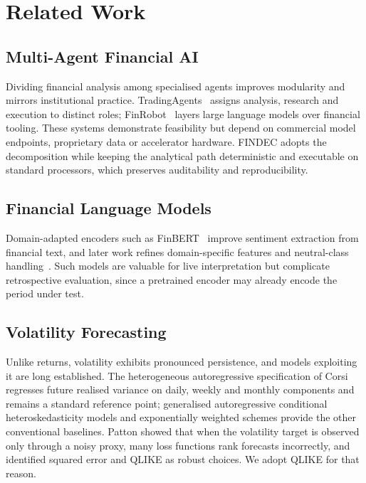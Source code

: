 \documentclass[conference]{IEEEtran}
\begin{document}
\section{Related Work}
\label{sec:related}

\subsection{Multi-Agent Financial AI}
Dividing financial analysis among specialised agents improves modularity and
mirrors institutional practice. TradingAgents~\cite{xiao2024tradingagents}
assigns analysis, research and execution to distinct roles;
FinRobot~\cite{yang2024finrobot} layers large language models over financial
tooling. These systems demonstrate feasibility but depend on commercial model
endpoints, proprietary data or accelerator hardware. FINDEC adopts the
decomposition while keeping the analytical path deterministic and executable
on standard processors, which preserves auditability and reproducibility.

\subsection{Financial Language Models}
Domain-adapted encoders such as FinBERT~\cite{araci2019finbert} improve
sentiment extraction from financial text, and later work refines
domain-specific features and neutral-class handling~\cite{sun2025financial}.
Such models are valuable for live interpretation but complicate retrospective
evaluation, since a pretrained encoder may already encode the period under
test.

\subsection{Volatility Forecasting}
Unlike returns, volatility exhibits pronounced persistence, and models
exploiting it are long established. The heterogeneous autoregressive
specification of Corsi regresses future realised variance on daily, weekly
and monthly components and remains a standard reference point; generalised
autoregressive conditional heteroskedasticity models and exponentially
weighted schemes provide the other conventional baselines. Patton showed that
when the volatility target is observed only through a noisy proxy, many loss
functions rank forecasts incorrectly, and identified squared error and QLIKE
as robust choices. We adopt QLIKE for that reason.
\end{document}
